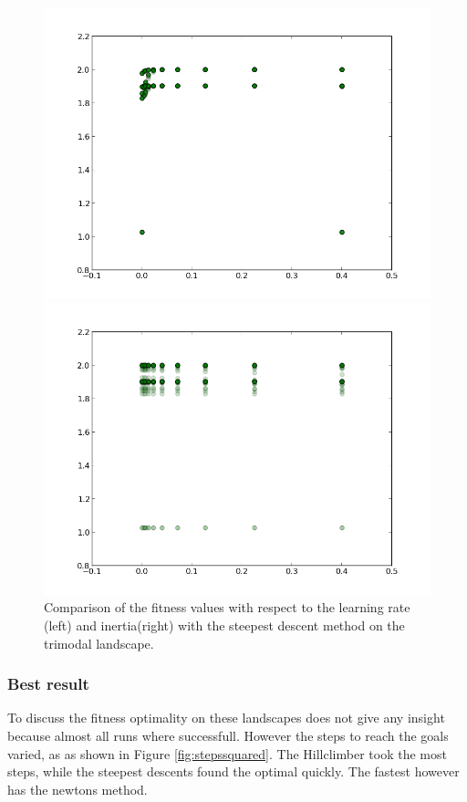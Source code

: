 \documentclass{scrartcl}
\begin{document}
\begin{figure}[H]
\centering
\begin{minipage}{.5\textwidth}
  \centering
  \includegraphics[width=.8\linewidth]{img/ex1/learning_trimodal_ss.png}
\end{minipage}%
\begin{minipage}{.5\textwidth}
  \centering
  \includegraphics[width=.8\linewidth]{img/ex1/inertia_trimodal_ss.png}
\end{minipage}
\caption{Comparison of the fitness values with respect to the learning rate (left) and inertia(right) with the steepest descent method on the trimodal landscape.}
\label{fig:inertialearning}
\end{figure}

\subsubsection{Best result}
To discuss the fitness optimality on these landscapes does not give any insight because almost all runs where successfull. However the steps to reach the goals varied, as as shown in Figure \ref{fig:stepssquared}. The Hillclimber took the most steps, while the steepest descents found the optimal quickly. The fastest however has the newtons method.
\end{document}
